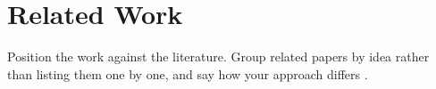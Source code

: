 \section{Related Work}
Position the work against the literature. Group related papers by idea rather than listing them one by
one, and say how your approach differs \cite{knuth1984,lamport1994}.
